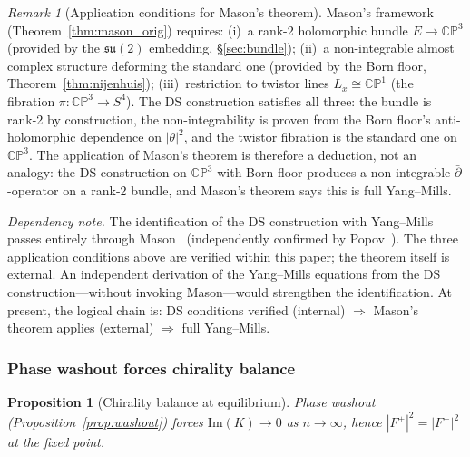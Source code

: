 \documentclass[11pt,a4paper]{article}
\newtheorem{proposition}[theorem]{Proposition}
\theoremstyle{definition}
\theoremstyle{remark}
\newtheorem{remark}[theorem]{Remark}
\newcommand{\CP}{\mathbb{CP}}
\newcommand{\dbar}{\bar{\partial}}
\newcommand{\su}{\mathfrak{su}}
\begin{document}
\begin{remark}[Application conditions for Mason's theorem]\label{rem:mason_conditions}
Mason's framework (Theorem~\ref{thm:mason_orig}) requires: (i)~a rank-2 holomorphic bundle $E\to\CP^3$ (provided by the $\su(2)$ embedding, \S\ref{sec:bundle}); (ii)~a non-integrable almost complex structure deforming the standard one (provided by the Born floor, Theorem~\ref{thm:nijenhuis}); (iii)~restriction to twistor lines $L_x\cong\CP^1$ (the fibration $\pi:\CP^3\to S^4$). The DS construction satisfies all three: the bundle is rank-2 by construction, the non-integrability is proven from the Born floor's anti-holomorphic dependence on $|\theta|^2$, and the twistor fibration is the standard one on $\CP^3$. The application of Mason's theorem is therefore a deduction, not an analogy: the DS construction on $\CP^3$ with Born floor produces a non-integrable $\dbar$-operator on a rank-2 bundle, and Mason's theorem says this is full Yang--Mills.

\emph{Dependency note.} The identification of the DS construction with Yang--Mills passes entirely through Mason~\cite{Mason2005} (independently confirmed by Popov~\cite{Popov2021}). The three application conditions above are verified within this paper; the theorem itself is external. An independent derivation of the Yang--Mills equations from the DS construction---without invoking Mason---would strengthen the identification. At present, the logical chain is: DS conditions verified (internal) $\Rightarrow$ Mason's theorem applies (external) $\Rightarrow$ full Yang--Mills.
\end{remark}


\subsubsection{Phase washout forces chirality balance}

\begin{proposition}[Chirality balance at equilibrium]\label{prop:balance}
Phase washout (Proposition~\ref{prop:washout}) forces $\mathrm{Im}(K)\to 0$ as $n\to\infty$, hence $|F^+|^2=|F^-|^2$ at the fixed point.
\end{proposition}
\end{document}
